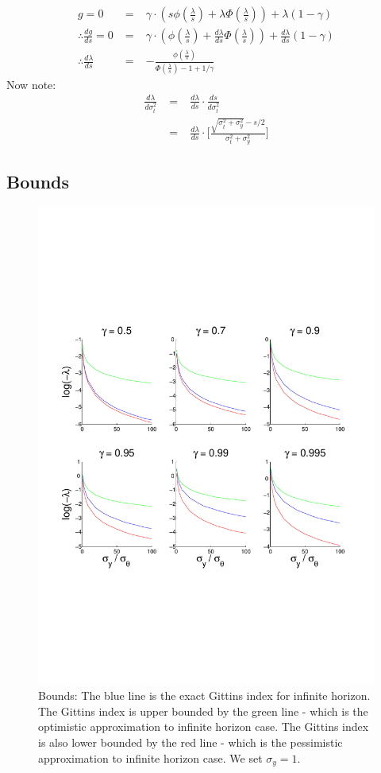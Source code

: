 \documentclass[a4paper,10pt]{article}
\newcommand{\pdff}{\phi(\tfrac{\lambda}{s})}
\newcommand{\cdff}{\Phi(\tfrac{\lambda}{s})}
\begin{document}
\begin{eqnarray}
 g =  0 &\;=\;& \gamma\cdot(s\pdff +\lambda\cdff) + \lambda(1-\gamma) \\
 \therefore \frac{dg}{ds} = 0 &\;=\;& \gamma\cdot(\pdff +\frac{d\lambda}{ds}\cdff) + \frac{d\lambda}{ds}(1-\gamma) \\
 \therefore \frac{d\lambda}{ds} &\;=\;& -\frac{\pdff}{\cdff-1 + 1/\gamma}
\end{eqnarray}
Now note:
\begin{eqnarray}
 \frac{d\lambda}{d\sigma_t^2} &\;=\;& \frac{d\lambda}{ds} \cdot \frac{ds}{d\sigma_t^2} \\
  &\;=\;& \frac{d\lambda}{ds} \cdot \Big[ \frac{ \sqrt{\sigma_t^2+\sigma_y^2} - s/2}{\sigma_t^2+\sigma_y^2}\Big]
\end{eqnarray}

\subsection{Bounds} 

\begin{figure}[h]
\centering
\includegraphics[width=0.81\linewidth]{bounds.pdf}
\caption{Bounds: The blue line is the exact Gittins index for infinite horizon.
The Gittins index is upper bounded by the green line - which is the optimistic approximation to infinite horizon case.
The Gittins index is also lower bounded by the red line - which is the pessimistic approximation to infinite horizon case.
We set $\sigma_y=1$.}
\end{figure}
\end{document}
